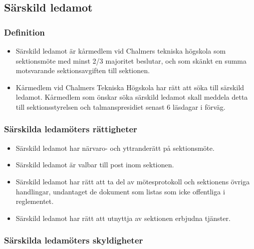 \documentclass[11pt,a4paper]{article}
\begin{document}
\subsection{Särskild ledamot}

\subsubsection{Definition}

\begin{itemize}

  \item Särskild ledamot är kårmedlem vid Chalmers tekniska högskola
  som sektionsmöte med minst 2/3 majoritet beslutar, och som skänkt en summa motsvarande sektionsavgiften till sektionen.
  
  \item Kårmedlem vid Chalmers Tekniska Högskola har rätt att söka till särskild ledamot. Kårmedlem som önskar söka särskild ledamot skall meddela detta till sektionsstyrelsen och talmanspresidiet senast 6 läsdagar i förväg.

\end{itemize}

\subsubsection{Särskilda ledamöters rättigheter}

\begin{itemize}

  \item Särskild ledamot har närvaro- och yttranderätt på
   sektionsmöte.

  \item Särskild ledamot är valbar till post inom sektionen.

   \item Särskild ledamot har rätt att ta del av mötesprotokoll och
   sektionens övriga handlingar, undantaget de dokument som listas som icke offentliga i reglementet.

  \item Särskild ledamot har rätt att utnyttja av sektionen erbjudna
   tjänster.

\end{itemize}

\subsubsection{Särskilda ledamöters skyldigheter}
\end{document}

